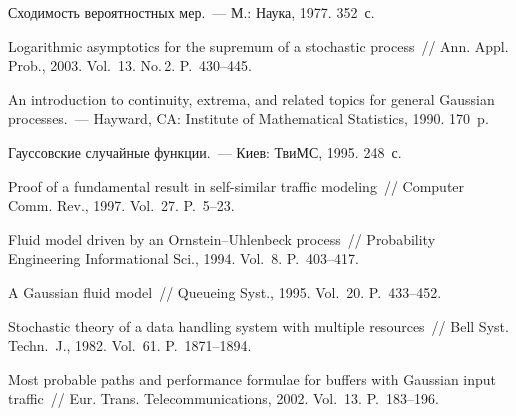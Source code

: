 \begin{multicols}{2}
{{\begin{thebibliography}{99}
 Сходимость вероятностных мер.~--- М.: Наука, 1977. 352~с.

 Logarithmic
asymptotics for the supremum of a stochastic process~// 
Ann. Appl. Prob., 2003. Vol.~13. No.\,2. P.~430--445.

 An introduction to continuity, extrema, and
related topics for general Gaussian processes.~--- Hayward, CA: Institute of 
Mathematical Statistics, 1990. 170~p.

 Гауссовские случайные функции.~--- Киев: ТвиМС, 1995. 248~с.


 Proof of a
fundamental result in self-similar traffic modeling~// Computer
Comm. Rev., 1997. Vol.~27. P.~5--23.


 Fluid model driven by an
Ornstein--Uhlenbeck process~// Probability  Engineering 
Informational Sci., 1994. Vol.~8. P.~403--417.

 A Gaussian fluid model~// Queueing
Syst., 1995. Vol.~20. P.~433--452.

 Stochastic theory of a
data handling system with multiple resources~// Bell Syst.
Techn.~J., 1982. Vol.~61. P.~1871--1894.

\label{end\stat}

 Most probable paths and
performance formulae for buffers with Gaussian input traffic~//
Eur. Trans. Telecommunications, 2002. Vol.~13.
P.~183--196.
\end{thebibliography}
}
}

\end{multicols}